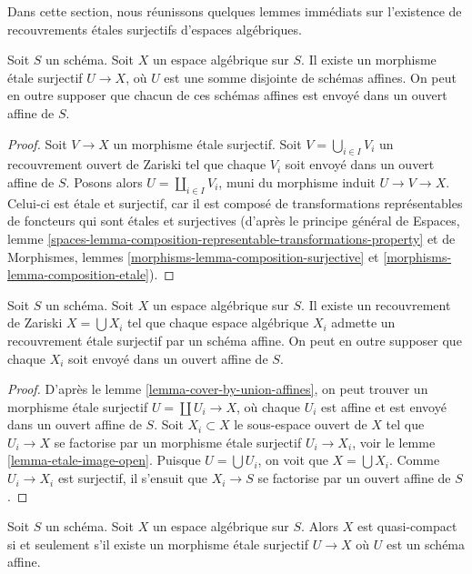 \noindent
Dans cette section, nous réunissons quelques lemmes immédiats sur l'existence
de recouvrements étales surjectifs d'espaces algébriques.

\begin{lemma}
\label{lemma-cover-by-union-affines}
Soit $S$ un schéma.
Soit $X$ un espace algébrique sur $S$.
Il existe un morphisme étale surjectif $U \to X$, où
$U$ est une somme disjointe de schémas affines.
On peut en outre supposer que chacun de ces schémas affines
est envoyé dans un ouvert affine de $S$.
\end{lemma}

\begin{proof}
Soit $V \to X$ un morphisme étale surjectif.
Soit $V = \bigcup_{i \in I} V_i$ un recouvrement ouvert de Zariski
tel que chaque $V_i$ soit envoyé dans un ouvert affine de $S$.
Posons alors $U = \coprod_{i \in I} V_i$, muni du morphisme induit
$U \to V \to X$. Celui-ci est étale et surjectif, car il est composé
de transformations représentables de foncteurs qui sont étales et
surjectives (d'après le principe général de
Espaces, lemme
\ref{spaces-lemma-composition-representable-transformations-property}
et de
Morphismes, lemmes \ref{morphisms-lemma-composition-surjective} et
\ref{morphisms-lemma-composition-etale}).
\end{proof}

\begin{lemma}
\label{lemma-union-of-quasi-compact}
Soit $S$ un schéma.
Soit $X$ un espace algébrique sur $S$.
Il existe un recouvrement de Zariski $X = \bigcup X_i$
tel que chaque espace algébrique $X_i$ admette un recouvrement
étale surjectif par un schéma affine. On peut en outre supposer
que chaque $X_i$ soit envoyé dans un ouvert affine de $S$.
\end{lemma}

\begin{proof}
D'après le lemme \ref{lemma-cover-by-union-affines}, on peut trouver un morphisme
étale surjectif $U = \coprod U_i \to X$, où chaque $U_i$ est affine et est envoyé
dans un ouvert affine de $S$. Soit $X_i \subset X$ le sous-espace ouvert
de $X$ tel que $U_i \to X$ se factorise par un morphisme étale surjectif
$U_i \to X_i$, voir le
lemme \ref{lemma-etale-image-open}.
Puisque $U = \bigcup U_i$, on voit que $X = \bigcup X_i$.
Comme $U_i \to X_i$ est surjectif, il s'ensuit que $X_i \to S$ se factorise par
un ouvert affine de $S$.
\end{proof}

\begin{lemma}
\label{lemma-quasi-compact-affine-cover}
Soit $S$ un schéma.
Soit $X$ un espace algébrique sur $S$.
Alors $X$ est quasi-compact si et seulement s'il
existe un morphisme étale surjectif $U \to X$
où $U$ est un schéma affine.
\end{lemma}

